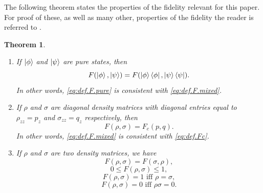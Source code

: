 \documentclass[
  american,aps,pra,reprint,floatfix,nofootinbib,superscriptaddress
]{revtex4-2}
\newtheorem{theorem}{Theorem}
\begin{document}
The following theorem states the properties of the fidelity relevant for this
paper. For proof of these, as well as many other, properties of the fidelity
the reader is referred to \cite[\S 9]{nielsen-chuang-2010}.
\begin{theorem}
  \begin{enumerate}
    \item If $\ket{\phi}$ and $\ket{\psi}$ are pure states, then
      \begin{equation}
        F(\ket{\phi}, \ket{\psi}) =
          F(\ket{\phi}\bra{\phi}, \ket{\psi}\bra{\psi}).
      \end{equation}
      In other words, \eqref{eq:def.F.pure} is consistent with
      \eqref{eq:def.F.mixed}.
    \item If $\rho$ and $\sigma$ are diagonal density matrices with diagonal
      entries equal to $\rho_{zz} = p_z$ and $\sigma_{zz} = q_z$ respectively, then
      \begin{equation}
        F(\rho, \sigma) = F_c(p, q).
      \end{equation}
      In other words, \eqref{eq:def.F.mixed} is consistent with \eqref{eq:def.Fc}.
    \item If $\rho$ and $\sigma$ are two density matrices, we have
      \begin{equation}
        \label{eq:prop.F.1}
        F(\rho, \sigma) = F(\sigma, \rho),
      \end{equation}
      \begin{equation}
        \label{eq:prop.F.2}
        0 \leq F(\rho, \sigma) \leq 1,
      \end{equation}
      \begin{equation}
        \label{eq:prop.F.3}
        F(\rho, \sigma) = 1 \textrm{ iff } \rho = \sigma,
      \end{equation}
      \begin{equation}
        \label{eq:prop.F.4}
        F(\rho, \sigma) = 0 \textrm{ iff } \rho \sigma = 0.
      \end{equation}
  \end{enumerate}
\end{theorem}
\end{document}
